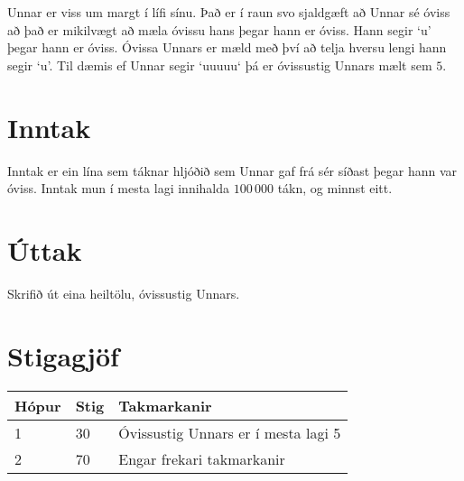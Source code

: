 %
Unnar er viss um margt í lífi sínu.
Það er í raun svo sjaldgæft að Unnar sé óviss að það er mikilvægt að mæla óvissu hans þegar hann er óviss.
Hann segir `u' þegar hann er óviss.
Óvissa Unnars er mæld með því að telja hversu lengi hann segir `u'.
Til dæmis ef Unnar segir `uuuuu` þá er óvissustig Unnars mælt sem $5$.

\section*{Inntak}
Inntak er ein lína sem táknar hljóðið sem Unnar gaf frá sér síðast þegar hann var óviss.
Inntak mun í mesta lagi innihalda $100\,000$ tákn, og minnst eitt.

\section*{Úttak}
Skrifið út eina heiltölu, óvissustig Unnars.

\section*{Stigagjöf}
\begin{tabular}{|l|l|l|}
\hline
Hópur & Stig & Takmarkanir \\ \hline
1     & 30  & Óvissustig Unnars er í mesta lagi 5\\ \hline
2     & 70  & Engar frekari takmarkanir\\ \hline
\end{tabular}

